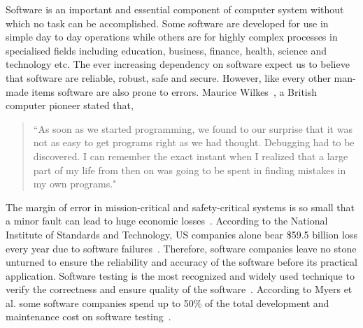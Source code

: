 Software is an important and essential component of computer system without which no task can be accomplished. Some software are developed for use in simple day to day operations while others are for highly complex processes in specialised fields including education, business, finance, health, science and technology etc. The ever increasing dependency on software expect us to believe that software are reliable, robust, safe and secure. However, like every other man-made items software are also prone to errors. Maurice Wilkes~\cite{wilkes1985memoirs}, a British computer pioneer stated that,
\begin{quote}
``As soon as we started programming, we found to our surprise that it was not as easy to get programs right as we had thought. Debugging had to be discovered. I can remember the exact instant when I realized that a large part of my life from then on was going to be spent in finding mistakes in my own programs."
\end{quote}
The margin of error in mission-critical and safety-critical systems is so small that a minor fault can lead to huge economic losses~\cite{huang2004securing}. According to the National Institute of Standards and Technology, US companies alone bear \$59.5 billion loss every year due to software failures~\cite{tassey2002economic}. Therefore, software companies leave no stone unturned to ensure the reliability and accuracy of the software before its practical application. Software testing is the most recognized and widely used technique to verify the correctness and ensure quality of the software~\cite{patton2001software}. According to Myers et al. some software companies spend up to 50\% of the total development and maintenance cost on software testing~\cite{myers2011art}. 

